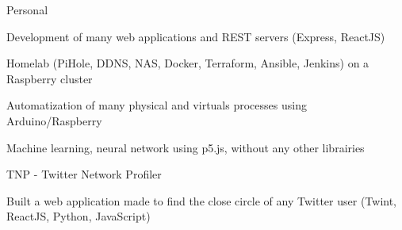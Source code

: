 
\begin{cventries}
  \cventry
    {} %
    {Personal} %
    {} %
    {} %
    {
      \begin{cvitems} %
        \item {Development of many web applications and REST servers (Express, ReactJS)}
        \item {Homelab (PiHole, DDNS, NAS, Docker, Terraform, Ansible, Jenkins) on a Raspberry cluster}
		    \item {Automatization of many physical and virtuals processes using Arduino/Raspberry}
        \item {Machine learning, neural network using p5.js, without any other librairies}
      \end{cvitems}
    }

  \cventry
    {} %
    {TNP - Twitter Network Profiler} %
    {} %
    {} %
    {
      \begin{cvitems} %
      	\item {Built a web application made to find the close circle of any Twitter user (Twint, ReactJS, Python, JavaScript)}
      \end{cvitems}
    }
\end{cventries}